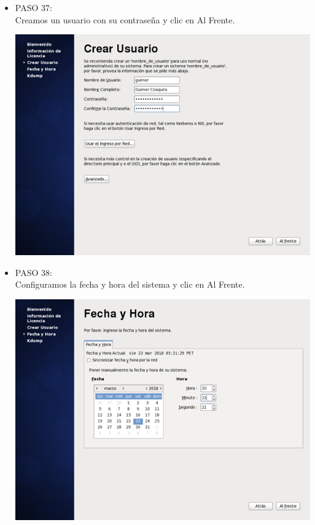 \begin{itemize}
\item PASO 37:
\\Creamos un usuario con su contraseña y clic en Al Frente.
		\begin{center}
		\includegraphics[width=13cm]{./Imagenes/37}
		\end{center}
	
	\end{itemize} 

\begin{itemize}
\item PASO 38:
\\Configuramos la fecha y hora del sistema y clic en Al Frente.
		\begin{center}
		\includegraphics[width=13cm]{./Imagenes/38}
		\end{center}
		\\\
	\end{itemize} 

